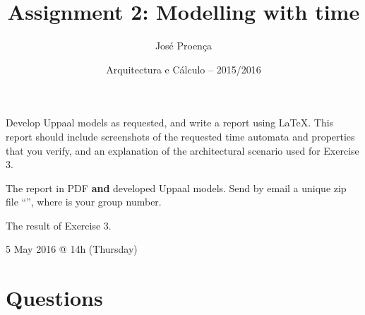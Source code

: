 \documentclass[11pt]{article}
\date{Arquitectura e C\'alculo -- 2015/2016}
\begin{document}
 
 
\title{Assignment 2: Modelling with time}
\author{Jos\'{e} Proen\c{c}a}
 
\maketitle

 Develop Uppaal models as requested, and write a report using LaTeX. This report should include screenshots of the requested time automata and properties that you verify, and an explanation of the architectural scenario used for Exercise 3.

 The report in PDF \textbf{and} developed Uppaal models. Send by email a unique zip file ``'', where  is your group number.

 The result of Exercise 3.

 5 May 2016 @ 14h (Thursday)
 
\section*{Questions}

%
%
%
%
%
\end{document}

